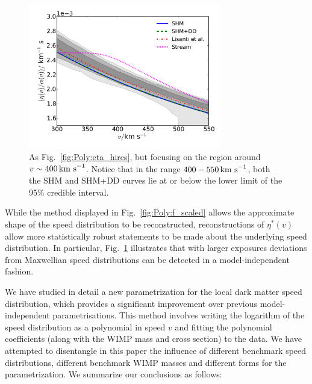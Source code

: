 \begin{figure}[t]
\centering
  \includegraphics[width=0.75\textwidth]{Poly/LIS_hires_zoom.pdf}
  \caption[As Fig.~\ref{fig:Poly:eta_hires}, but focusing on the region around $v \sim 400 \kms$.]{As Fig.~\ref{fig:Poly:eta_hires}, but focusing on the region around $v \sim 400 \kms$. Notice that in the range $400-550 \,\textrm{km s}^{-1}$, both the SHM and SHM+DD curves lie at or below the lower limit of the 95\% credible interval.}
  \label{fig:Poly:eta_hires_zoom}
\end{figure}

While the method displayed in Fig.~\ref{fig:Poly:f_scaled} allows the approximate shape of the speed distribution to be reconstructed, reconstructions of $\eta^*(v)$ allow more statistically robust statements to be made about the underlying speed distribution. In particular, Fig.~\ref{fig:Poly:eta_hires_zoom} illustrates that with larger exposures deviations from Maxwellian speed distributions can be detected in a model-independent fashion.

\label{sec:Conclusions}

We have studied in detail a new parametrization for the local dark matter speed distribution, which provides a significant improvement over previous model-independent parametrisations. This method involves writing the logarithm of the speed distribution as a polynomial in speed $v$ and fitting the polynomial coefficients (along with the WIMP mass and cross section) to the data. We have attempted to disentangle in this paper the influence of  different benchmark speed distributions, different benchmark WIMP masses and different forms for the parametrization.  We summarize our conclusions as follows:

